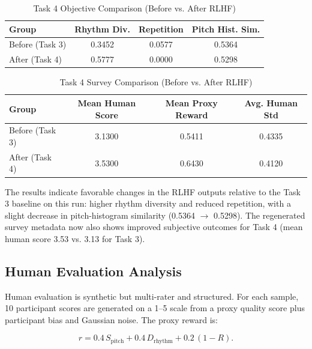\documentclass[conference]{IEEEtran}
\begin{document}
\begin{table}[!t]
\caption{Task 4 Objective Comparison (Before vs. After RLHF)}
\label{tab:task4-objective-compare}
\begin{center}
\begin{tabular}{lccc}
\toprule
Group & Rhythm Div. & Repetition & Pitch Hist. Sim. \\
\midrule
Before (Task 3) & 0.3452 & 0.0577 & 0.5364 \\
After (Task 4) & 0.5777 & 0.0000 & 0.5298 \\
\bottomrule
\end{tabular}
\end{center}
\end{table}

\begin{table}[!t]
\caption{Task 4 Survey Comparison (Before vs. After RLHF)}
\label{tab:task4-survey-compare}
\begin{center}
\begin{tabular}{lccc}
\toprule
Group & Mean Human Score & Mean Proxy Reward & Avg. Human Std \\
\midrule
Before (Task 3) & 3.1300 & 0.5411 & 0.4335 \\
After (Task 4) & 3.5300 & 0.6430 & 0.4120 \\
\bottomrule
\end{tabular}
\end{center}
\end{table}

The results indicate favorable changes in the RLHF outputs relative to the Task 3 baseline on this run: higher rhythm diversity and reduced repetition, with a slight decrease in pitch-histogram similarity (0.5364 $\rightarrow$ 0.5298). The regenerated survey metadata now also shows improved subjective outcomes for Task 4 (mean human score 3.53 vs. 3.13 for Task 3).

\subsection{Human Evaluation Analysis}
Human evaluation is synthetic but multi-rater and structured. For each sample, 10 participant scores are generated on a 1--5 scale from a proxy quality score plus participant bias and Gaussian noise. The proxy reward is:

\begin{equation}
r = 0.4\,S_{\text{pitch}} + 0.4\,D_{\text{rhythm}} + 0.2\,(1-R).
\end{equation}
\end{document}
